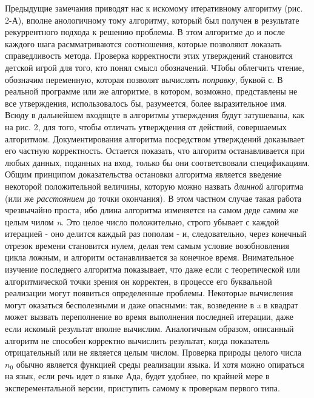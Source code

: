 \documentclass{mai_book}
\begin{document}
Предыдущие замечания приводят нас к искомому итеративному алгоритму (рис. 2-А), вполне анологичному тому алгоритму, который был получен в результате рекуррентного
подхода к решению проблемы. В этом алгоритме до и после каждого шага расмматриваются соотношения, которые позволяют локазать справедливость метода. Проверка корректности этих утверждений становится детской игрой для того, кто понял смысл обозначений. ЧТобы облегчить чтение, обозначим переменную, которая позволят вычислять {\it поправку}, буквой с.
В реальной программе или же алгоритме, в котором, возможно, представлены не все утверждения, использовалось бы, разумеется, более выразительное имя.
Всюду в дальнейшем входящте в алгоритмы утверждения будут затушеваны, как на рис. 2, для того, чтобы отличать утверждения от действий, совершаемых алгоритмом.
Документирования алгоритма посредством утверждений доказывает его частную корректность. Остается показать, что алгоритм останавливается при любых данных, поданных на вход, только бы они соответсвовали спецификациям.
Общим принципом доказательства остановки алгоритма является введение некоторой положительной величины, которую можно назвать {\it длинной} алгоритма (или же {\it расстоянием} до точки окончания). В этом частном случае такая работа чрезвычайно проста, ибо длина алгоритма изменяется на самом деде самим же целым чилом {\it n}. Это целое число положительно, строго убывает с каждой итерацией - оно делится каждый раз пополам - и, следовательно, через конечный отрезок времени становится нулем, делая тем самым условие возобновления цикла ложным, и алгоритм останавливается за конечное время.
Внимательное изучение последнего алгоритма показывает, что даже если с теоретической или алгоритмической точки зрения он корректен, в процессе его буквальной реализации могут появиться определенные проблемы. Некоторые вычисления могут оказаться бесполезными и даже опасными: так, возведение в {\it x} в квадрат может вызвать переполнение во время выполнения последней итерации, даже если искомый результат вполне вычислим.
Аналогичным образом, описанный алгоритм не способен корректно вычислить результат, когда показатель отрицательный или не является целым числом. Проверка природы целого числа {\it \large{$n_0$}} обычно является функцией среды реализации языка. И хотя можно опираться на язык, если речь идет о языке Ада, будет удобнее, по крайней мере в эксперементальной версии, приступить самому к проверкам первого типа.
\newpage
\end{document}
